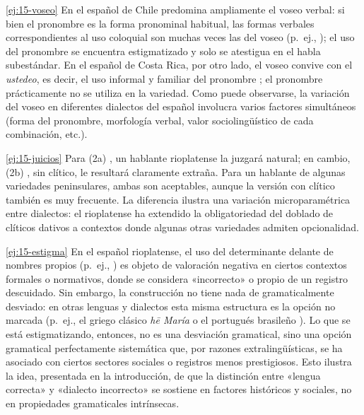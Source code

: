 \begin{solucion}{\ref{ej:15-voseo}}
En el español de Chile predomina ampliamente el voseo verbal: si bien el
pronombre  es la forma pronominal habitual, las formas verbales
correspondientes al uso coloquial son muchas veces las del voseo (p.~ej.,
); el uso del pronombre  se encuentra
estigmatizado y solo se atestigua en el habla subestándar. En el español de Costa
Rica, por otro lado, el voseo convive con el \textit{ustedeo}, es decir, el uso
informal y familiar del pronombre ; el pronombre 
prácticamente no se utiliza en la variedad. Como puede observarse, la variación
del voseo en diferentes dialectos del español involucra varios factores
simultáneos (forma del pronombre, morfología verbal, valor sociolingüístico de
cada combinación, etc.).
\end{solucion}

\begin{solucion}{\ref{ej:15-juicios}}
Para (2a) , un hablante rioplatense la juzgará
natural; en cambio, (2b) , sin clítico, le
resultará claramente extraña. Para un hablante de algunas variedades
peninsulares, ambas son aceptables, aunque la versión con clítico también es muy
frecuente. La diferencia ilustra una variación microparamétrica entre dialectos:
el rioplatense ha extendido la obligatoriedad del doblado de clíticos dativos a
contextos donde algunas otras variedades admiten opcionalidad.
\end{solucion}

\begin{solucion}{\ref{ej:15-estigma}}
En el español rioplatense, el uso del determinante delante de nombres propios
(p.~ej., ) es objeto de
valoración negativa en ciertos contextos formales o normativos, donde se
considera «incorrecto» o propio de un registro descuidado. Sin embargo, la
construcción no tiene nada de gramaticalmente desviado: en otras lenguas y
dialectos esta misma estructura es la opción no marcada (p.~ej., el griego
clásico \textit{hē María}  o el portugués brasileño 
). Lo que se está estigmatizando, entonces, no es una desviación
gramatical, sino una opción gramatical perfectamente sistemática que, por razones
extralingüísticas, se ha asociado con ciertos sectores sociales o registros menos
prestigiosos. Esto ilustra la idea, presentada en la introducción, de que la
distinción entre «lengua correcta» y «dialecto incorrecto» se sostiene en
factores históricos y sociales, no en propiedades gramaticales
intrínsecas.
\end{solucion}
